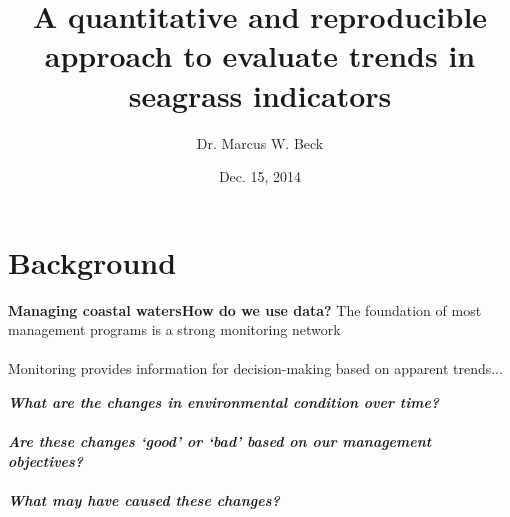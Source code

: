 \documentclass[serif]{beamer}\usepackage[]{graphicx}\usepackage[]{color}
\newcommand{\emtxt}[1]{\textbf{\textit{#1}}}
\begin{document}
\title[Evaluating water quality]{\textbf{A quantitative and reproducible approach to evaluate trends in seagrass indicators}}
\author[M. Beck]{Dr. Marcus W. Beck}


\date{Dec. 15, 2014}


\begin{frame}[shrink]
\titlepage
\end{frame}

\section{Background}

\begin{frame}{\textbf{Managing coastal waters}}{\textbf{How do we use data?}}
The foundation of most management programs is a strong monitoring network \\~\\
Monitoring provides information for decision-making based on apparent trends...
\vspace{0.2in}
\begin{center}
\emtxt{What are the changes in environmental condition over time?}\\~\\
\emtxt{Are these changes `good' or `bad' based on our management objectives?}\\~\\
\emtxt{What may have caused these changes?}
\end{center}
\end{frame}
\end{document}
